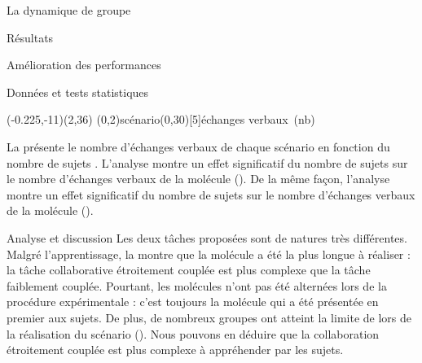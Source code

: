 \documentclass[myfrancais]{mythesis}
\begin{document}
\begin{mychapter}{La dynamique de groupe}
\begin{mysection}{Résultats}
\begin{mysubsection}{Amélioration des performances}
\begin{mysubsubsection}{Données et tests statistiques}
					\begin{myfigure}
						\begin{myps}(-0.225,-11)(2,36)
							\myaxes(0,2){scénario}(0,30)[5]{échanges verbaux~(nb)}
						\end{myps}
					\end{myfigure}

					La  présente le nombre d'échanges verbaux  de chaque scénario  en fonction du nombre de sujets .
					L'analyse montre un effet significatif du nombre de sujets  sur le nombre d'échanges verbaux  de la molécule \myPrion ().
					De la même façon, l'analyse montre un effet significatif du nombre de sujets  sur le nombre d'échanges verbaux  de la molécule \myUbiquitin ().
				\end{mysubsubsection}
				\begin{mysubsubsection}{Analyse et discussion}
					Les deux tâches proposées sont de natures très différentes.
					Malgré l'apprentissage, la  montre que la molécule \myUbiquitin a été la plus longue à réaliser : la tâche collaborative étroitement couplée est plus complexe que la tâche faiblement couplée.
					Pourtant, les molécules n'ont pas été alternées lors de la procédure expérimentale  : c'est toujours la molécule \myPrion qui a été présentée en premier aux sujets.
					De plus, de nombreux groupes ont atteint la limite de  lors de la réalisation du scénario  (\myUbiquitin).
					Nous pouvons en déduire que la collaboration étroitement couplée est plus complexe à appréhender par les sujets.


\end{mysubsubsection}
\end{mysubsection}
\end{mysection}
\end{mychapter}
\end{document}
